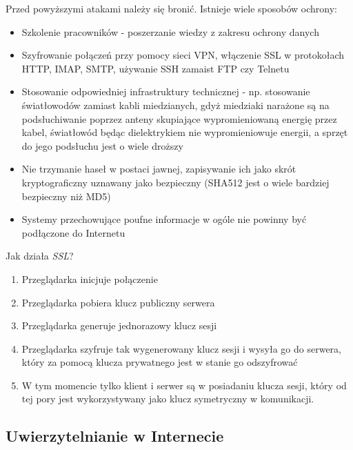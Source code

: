 Przed powyższymi atakami należy się bronić. Istnieje wiele sposobów ochrony:
\begin{itemize}
	\item Szkolenie pracowników - poszerzanie wiedzy z zakresu ochrony danych
    \item Szyfrowanie połączeń przy pomocy sieci VPN, włączenie SSL w protokołach HTTP, IMAP, SMTP, używanie SSH zamaist FTP czy Telnetu
    \item Stosowanie odpowiedniej infrastruktury technicznej - np. stosowanie światłowodów zamiast kabli miedzianych, gdyż miedziaki narażone są na podsłuchiwanie poprzez anteny skupiające wypromieniowaną energię przez kabel, światłowód będąc dielektrykiem nie wypromieniowuje energii, a sprzęt do jego podsłuchu jest o wiele droższy
    \item Nie trzymanie haseł w postaci jawnej, zapisywanie ich jako skrót kryptograficzny uznawany jako bezpieczny (SHA512 jest o wiele bardziej bezpieczny niż MD5)
    \item Systemy przechowujące poufne informacje w ogóle nie powinny być podłączone do Internetu
\end{itemize}

Jak działa \textit{SSL}?
\begin{enumerate}
	\item Przeglądarka inicjuje połączenie
	\item Przeglądarka pobiera klucz publiczny serwera
	\item Przeglądarka generuje jednorazowy klucz sesji
	\item Przeglądarka szyfruje tak wygenerowany klucz sesji i wysyła go do serwera, który za pomocą klucza prywatnego jest w stanie go odszyfrować
	\item W tym momencie tylko klient i serwer są w posiadaniu klucza sesji, który od tej pory jest wykorzystywany jako klucz symetryczny w komunikacji.
\end{enumerate}

\subsection{Uwierzytelnianie w Internecie}

